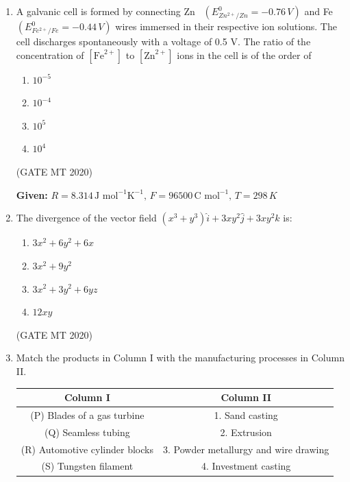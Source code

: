 \documentclass[journal, 11pt, onecolumn]{IEEEtran}
\theoremstyle{remark}
\begin{document}
\begin{enumerate}
\item A galvanic cell is formed by connecting Zn \, $(E^{0}_{Zn^{2+}/Zn} = -0.76 \, V)$ and Fe \, $(E^{0}_{Fe^{2+}/Fe} = -0.44 \, V)$ wires immersed in their respective ion solutions. The cell discharges spontaneously with a voltage of 0.5 V. The ratio of the concentration of $[\text{Fe}^{2+}]$ to $[\text{Zn}^{2+}]$ ions in the cell is of the order of  
\begin{multicols}{4}
\begin{enumerate}
\item $10^{-5}$  
\item $10^{-4}$  
\item $10^{5}$  
\item $10^{4}$  
\end{enumerate}
\end{multicols}
\hfill(GATE MT 2020)

\textbf{Given:} $R = 8.314 \, \text{J mol}^{-1}\text{K}^{-1}, \, F = 96500 \, \text{C mol}^{-1}, \, T = 298 \, K$


\item The divergence of the vector field $(x^{3} + y^{3})\hat{i} + 3xy^{2}\hat{j} + 3xy^{2}\hat{k}$ is:  

\begin{enumerate}
\item $3x^{2} + 6y^{2} + 6x$  
\item $3x^{2} + 9y^{2}$  
\item $3x^{2} + 3y^{2} + 6yz$  
\item $12xy$  
\end{enumerate}
\hfill(GATE MT 2020)


\item Match the products in Column I with the manufacturing processes in Column II.  

\begin{center}
\begin{tabular}{|c|c|}
\hline
\textbf{Column I} & \textbf{Column II} \\
\hline
(P) Blades of a gas turbine & 1. Sand casting \\
(Q) Seamless tubing & 2. Extrusion \\
(R) Automotive cylinder blocks & 3. Powder metallurgy and wire drawing \\
(S) Tungsten filament & 4. Investment casting \\
\hline
\end{tabular}
\end{center}


\end{enumerate}
\end{document}
